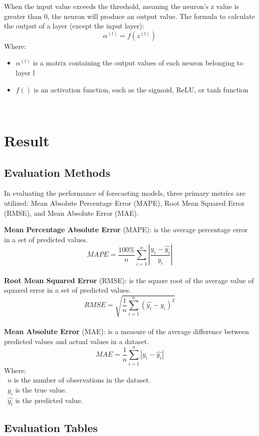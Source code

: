 \documentclass{ieeeojies}
\begin{document}
When the input value exceeds the threshold, meaning the neuron's z value is greater than 0, the neuron will produce an output value. The formula to calculate the output of a layer (except the input layer):
\[ \alpha^{(l)} = f(z^{(l)}) \]
Where:
    \begin{itemize}
        \item $\alpha^{(l)}$ is a matrix containing the output values of each neuron belonging to layer l
        \item  $f()$ is an activation function, such as the sigmoid, ReLU, or tanh function
        \cite{mlp}
    \end{itemize}\\
    
\section{Result}
\subsection{Evaluation Methods}
In evaluating the performance of forecasting models, three primary metrics are utilized: Mean Absolute Percentage Error (MAPE), Root Mean Squared Error (RMSE), and Mean Absolute Error (MAE).

\textbf{Mean Percentage Absolute Error} (MAPE): is the average percentage error in a set of predicted values.
\[MAPE=\frac{100\%}{n}  \sum_{i=1}^{n} |\frac{y_i-\hat{y_i}}{y_i}|\]\\
\textbf{Root Mean Squared Error} (RMSE): is the square root of the average value of squared error in a set of predicted values.
\[RMSE=\sqrt{\frac{1}{n} \sum_{i=1}^{n}(\hat{y_i}-y_i )^2}\]\\
\textbf{Mean Absolute Error} (MAE): is a measure of the average difference between predicted values and actual values in a dataset.
\[MAE = \frac{1}{n} \sum_{i=1}^{n} |y_i - \hat{y_i}| \]
Where: \\
	\indent\textbullet\ \(n\) is the number of observations in the dataset.\\
	\indent\textbullet\ \(y_i\)  is the true value.\\
	\indent\textbullet\ \(\hat{y_i}\) is the predicted value.
        \cite{sefidian_guide}
        
\subsection{Evaluation Tables} 
\end{document}
